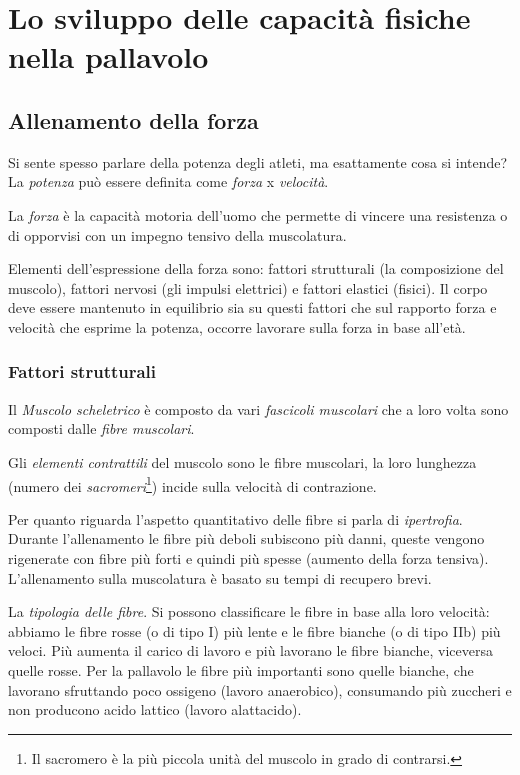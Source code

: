 \chapter{Lo sviluppo delle capacità fisiche nella pallavolo}

\section{Allenamento della forza}
Si sente spesso parlare della potenza degli atleti, ma esattamente cosa si
intende? La \emph{potenza} può essere definita come \emph{forza} x
\emph{velocità}.

\begin{defi}
La \emph{forza} è la capacità motoria dell'uomo che permette di vincere una resistenza o di opporvisi con un impegno tensivo della muscolatura.
\end{defi}

Elementi dell'espressione della forza sono: fattori strutturali (la composizione
del muscolo), fattori nervosi (gli impulsi elettrici) e fattori elastici (fisici).
Il corpo deve essere mantenuto in equilibrio sia su questi fattori che sul
rapporto forza e velocità che esprime la potenza, occorre lavorare sulla forza
in base all'età.

\subsection{Fattori strutturali}
Il \emph{Muscolo scheletrico} è composto da vari \emph{fascicoli muscolari}
che a loro volta sono composti dalle \emph{fibre muscolari}.

Gli \emph{elementi contrattili} del muscolo sono le fibre muscolari, la loro
lunghezza (numero dei \emph{sacromeri}\footnote{Il sacromero è la più piccola
unità del muscolo in grado di contrarsi.}) incide sulla velocità di contrazione.

Per quanto riguarda l'aspetto quantitativo delle fibre si parla di
\emph{ipertrofia}. Durante l'allenamento le fibre più deboli subiscono più
danni, queste vengono rigenerate con fibre più forti e quindi più spesse
(aumento della forza tensiva). L'allenamento sulla muscolatura è basato su
tempi di recupero brevi.

La \emph{tipologia delle fibre}. Si possono classificare le fibre in base alla
loro velocità: abbiamo le fibre rosse (o di tipo I) più lente e le fibre bianche
(o di tipo IIb) più veloci. Più aumenta il carico di lavoro e più lavorano le
fibre bianche, viceversa quelle rosse. Per la pallavolo le fibre più importanti
sono quelle bianche, che lavorano sfruttando poco ossigeno (lavoro anaerobico), consumando più zuccheri e non producono acido lattico (lavoro alattacido). 


